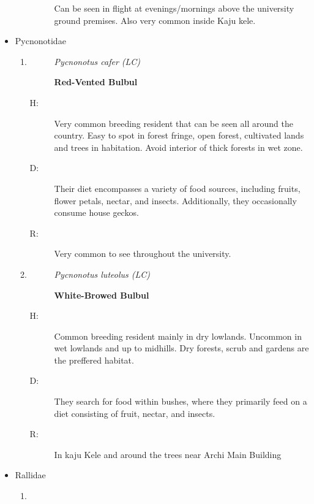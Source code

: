 \begin{itemize}
\begin{enumerate}
\begin{description}
Can be seen in flight at evenings/mornings above the university ground premises. Also very common inside Kaju kele.%
\end{description}%
\end{enumerate}%
\item%
Pycnonotidae%
\begin{enumerate}%
\item%
\begin{description}%
\item[]%
\textit{Pycnonotus cafer (LC)}%
\item[]%
\textbf{Red{-}Vented Bulbul}%
\end{description}%
\begin{description}%
\item[H: ]%
Very common breeding resident that can be seen all around the country. Easy to spot in forest fringe, open forest, cultivated lands and trees in habitation.  Avoid interior of thick forests in wet zone.%
\item[D: ]%
Their diet encompasses a variety of food sources, including fruits, flower petals, nectar, and insects. Additionally, they occasionally consume house geckos.%
\item[R: ]%
Very common to see throughout the university.%
\end{description}%
\item%
\begin{description}%
\item[]%
\textit{Pycnonotus luteolus (LC)}%
\item[]%
\textbf{White{-}Browed Bulbul}%
\end{description}%
\begin{description}%
\item[H: ]%
Common breeding resident mainly in dry lowlands. Uncommon in wet lowlands and up to midhills. Dry forests, scrub and gardens are the preffered habitat.%
\item[D: ]%
They search for food within bushes, where they primarily feed on a diet consisting of fruit, nectar, and insects.%
\item[R: ]%
In kaju Kele and around the trees near Archi Main Building%
\end{description}%
\end{enumerate}%
\item%
Rallidae%
\begin{enumerate}%
\item%
\begin{description}%
\item[]%

\end{description}
\end{enumerate}
\end{itemize}
